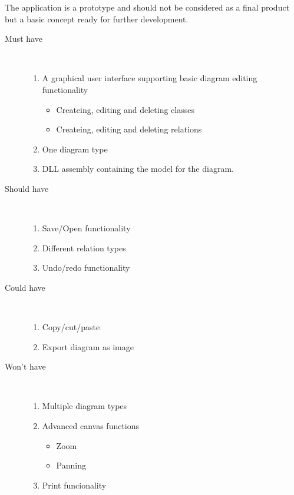 The application is a prototype and should not be considered as a final product 
but a basic concept ready for further development.

\begin{description}
	\item[Must have] \hfill \\
	\begin{enumerate}
		\item A graphical user interface supporting basic diagram editing 
		functionality
		\begin{itemize}
			\item Createing, editing and deleting classes
			\item Createing, editing and deleting relations
		\end{itemize}
		\item One diagram type
		\item DLL assembly containing the model for the diagram.
	\end{enumerate}
	\item[Should have] \hfill \\
	\begin{enumerate}
		\item Save/Open functionality
		\item Different relation types
		\item Undo/redo functionality
	\end{enumerate}
	\item[Could have] \hfill \\
	\begin{enumerate}
		\item Copy/cut/paste
		\item Export diagram as image
	\end{enumerate}
	\item[Won't have] \hfill \\
	\begin{enumerate}
		\item Multiple diagram types
		\item Advanced canvas functions
		\begin{itemize}
			\item Zoom
			\item Panning
		\end{itemize}
		\item Print funcionality
	\end{enumerate}
\end{description}





